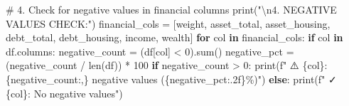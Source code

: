 \documentclass[
  letterpaper,
  DIV=11,
  numbers=noendperiod]{scrartcl}
\newenvironment{Shaded}{\begin{snugshade}}{\end{snugshade}}
\newcommand{\BuiltInTok}[1]{\textcolor[rgb]{0.00,0.23,0.31}{#1}}
\newcommand{\CharTok}[1]{\textcolor[rgb]{0.13,0.47,0.30}{#1}}
\newcommand{\CommentTok}[1]{\textcolor[rgb]{0.37,0.37,0.37}{#1}}
\newcommand{\ControlFlowTok}[1]{\textcolor[rgb]{0.00,0.23,0.31}{\textbf{#1}}}
\newcommand{\DecValTok}[1]{\textcolor[rgb]{0.68,0.00,0.00}{#1}}
\newcommand{\KeywordTok}[1]{\textcolor[rgb]{0.00,0.23,0.31}{\textbf{#1}}}
\newcommand{\NormalTok}[1]{\textcolor[rgb]{0.00,0.23,0.31}{#1}}
\newcommand{\OperatorTok}[1]{\textcolor[rgb]{0.37,0.37,0.37}{#1}}
\newcommand{\SpecialCharTok}[1]{\textcolor[rgb]{0.37,0.37,0.37}{#1}}
\newcommand{\SpecialStringTok}[1]{\textcolor[rgb]{0.13,0.47,0.30}{#1}}
\newcommand{\StringTok}[1]{\textcolor[rgb]{0.13,0.47,0.30}{#1}}
\begin{document}
\begin{Shaded}
\begin{Highlighting}[]
\CommentTok{\# 4. Check for negative values in financial columns}
\BuiltInTok{print}\NormalTok{(}\StringTok{"}\CharTok{\textbackslash{}n}\StringTok{4. NEGATIVE VALUES CHECK:"}\NormalTok{)}
\NormalTok{financial\_cols }\OperatorTok{=}\NormalTok{ [}\StringTok{\textquotesingle{}weight\textquotesingle{}}\NormalTok{, }\StringTok{\textquotesingle{}asset\_total\textquotesingle{}}\NormalTok{, }\StringTok{\textquotesingle{}asset\_housing\textquotesingle{}}\NormalTok{, }\StringTok{\textquotesingle{}debt\_total\textquotesingle{}}\NormalTok{, }\StringTok{\textquotesingle{}debt\_housing\textquotesingle{}}\NormalTok{, }\StringTok{\textquotesingle{}income\textquotesingle{}}\NormalTok{, }\StringTok{\textquotesingle{}wealth\textquotesingle{}}\NormalTok{]}
\ControlFlowTok{for}\NormalTok{ col }\KeywordTok{in}\NormalTok{ financial\_cols:}
    \ControlFlowTok{if}\NormalTok{ col }\KeywordTok{in}\NormalTok{ df.columns:}
\NormalTok{        negative\_count }\OperatorTok{=}\NormalTok{ (df[col] }\OperatorTok{\textless{}} \DecValTok{0}\NormalTok{).}\BuiltInTok{sum}\NormalTok{()}
\NormalTok{        negative\_pct }\OperatorTok{=}\NormalTok{ (negative\_count }\OperatorTok{/} \BuiltInTok{len}\NormalTok{(df)) }\OperatorTok{*} \DecValTok{100}
        \ControlFlowTok{if}\NormalTok{ negative\_count }\OperatorTok{\textgreater{}} \DecValTok{0}\NormalTok{:}
            \BuiltInTok{print}\NormalTok{(}\SpecialStringTok{f"   ⚠️ }\SpecialCharTok{\{}\NormalTok{col}\SpecialCharTok{\}}\SpecialStringTok{: }\SpecialCharTok{\{}\NormalTok{negative\_count}\SpecialCharTok{:,\}}\SpecialStringTok{ negative values (}\SpecialCharTok{\{}\NormalTok{negative\_pct}\SpecialCharTok{:.2f\}}\SpecialStringTok{\%)"}\NormalTok{)}
        \ControlFlowTok{else}\NormalTok{:}
            \BuiltInTok{print}\NormalTok{(}\SpecialStringTok{f"   ✓ }\SpecialCharTok{\{}\NormalTok{col}\SpecialCharTok{\}}\SpecialStringTok{: No negative values"}\NormalTok{)}


\end{Highlighting}
\end{Shaded}
\end{document}
